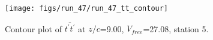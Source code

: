 \begin{figure}[H]
\centering
\texttt{[image: figs/run\_47/run\_47\_tt\_contour]}
\caption{Contour plot of $\overline{t^\prime t^\prime}$ at $z/c$=9.00, $V_{free}$=27.08, station 5.}
\label{fig:run_47_tt_contour}
\end{figure}


